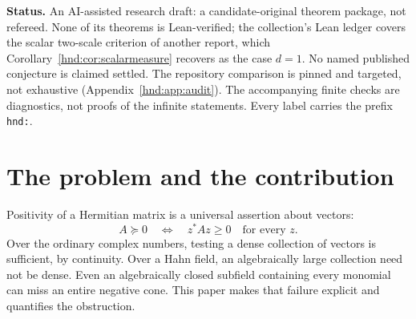 \documentclass[11pt,oneside]{article}
\theoremstyle{definition}
\theoremstyle{remark}
\newcommand{\eps}{\varepsilon}
\begin{document}
\begin{titlepage}
\begin{minipage}{0.9\textwidth}
\begin{abstract}
A second theorem characterizes positivity of a two-scale matrix-valued
measure $M_0+\eps M_1$ by ordinary scalar null ideals together with a
vector-valued absolute-continuity condition. The latter detects the
coupling into a residual kernel that scalar positivity misses. It is the
two-scale case of the matrix-valued null-ideal criterion that the
collection's Hahn--Herglotz report excludes from its scope.
All assertions proposed as contributions have written proofs. The
support-field construction, character automorphisms, finite spectral
algebra, and elementary density obstruction are explicitly treated as
background, not new discoveries.
\end{abstract}
\end{minipage}
\vfill
\begin{minipage}{.9\textwidth}
\small
\textbf{Status.} An AI-assisted research draft: a candidate-original
theorem package, not refereed. None of its theorems is Lean-verified;
the collection's Lean ledger covers the scalar two-scale criterion of
another report, which Corollary~\ref{hnd:cor:scalarmeasure} recovers as the
case $d=1$. No named published conjecture is claimed settled. The repository
comparison is pinned and targeted, not exhaustive
(Appendix~\ref{hnd:app:audit}). The accompanying finite checks are
diagnostics, not proofs of the infinite statements. Every label carries
the prefix \texttt{hnd:}.
\end{minipage}
\end{titlepage}
\hypersetup{pageanchor=true}

\tableofcontents
\clearpage
{}

\section{The problem and the contribution}\label{hnd:sec:intro}

Positivity of a Hermitian matrix is a universal assertion about vectors:
\begin{equation}\label{hnd:eq:psd}
 A\succeq0\quad\Longleftrightarrow\quad z^*Az\ge0\quad\text{for every }z.
\end{equation}
Over the ordinary complex numbers, testing a dense collection of vectors
is sufficient, by continuity. Over a Hahn field, an algebraically large
collection need not be dense. Even an algebraically closed subfield
containing every monomial can miss an entire negative cone. This paper
makes that failure explicit and quantifies the obstruction.
\end{document}
